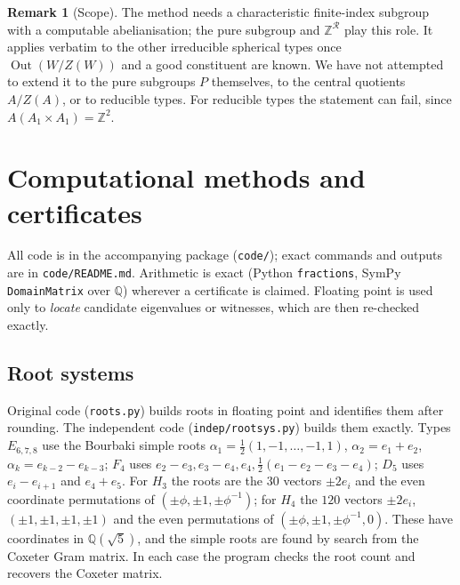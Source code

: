 \documentclass[11pt]{amsart}
\theoremstyle{definition}
\newtheorem{remark}[theorem]{Remark}
\newcommand{\Z}{\mathbb{Z}}
\newcommand{\Q}{\mathbb{Q}}
\newcommand{\R}{\mathcal{R}}
\newcommand{\Out}{\operatorname{Out}}
\begin{document}
\begin{remark}[Scope]
The method needs a characteristic finite-index subgroup with a computable abelianisation; the pure subgroup and
$\Z^\R$ play this role. It applies verbatim to the other irreducible spherical types once $\Out(W/Z(W))$ and a good
constituent are known. We have not attempted to extend it to the pure subgroups $P$ themselves, to the central
quotients $A/Z(A)$, or to reducible types. For reducible types the statement can fail, since $A(A_1\times A_1)=\Z^2$.
\end{remark}

\appendix
\section{Computational methods and certificates}\label{app:comp}

All code is in the accompanying package (\texttt{code/}); exact commands and outputs are in
\texttt{code/README.md}. Arithmetic is exact (Python \texttt{fractions}, SymPy \texttt{DomainMatrix} over $\Q$)
wherever a certificate is claimed. Floating point is used only to \emph{locate} candidate eigenvalues or
witnesses, which are then re-checked exactly.

\subsection{Root systems}\label{app:roots}
Original code (\texttt{roots.py}) builds roots in floating point and identifies them after rounding. The
independent code (\texttt{indep/rootsys.py}) builds them exactly. Types $E_{6,7,8}$ use the Bourbaki simple roots
$\alpha_1=\frac12(1,-1,\dots,-1,1)$, $\alpha_2=e_1+e_2$, $\alpha_k=e_{k-2}-e_{k-3}$; $F_4$ uses $e_2-e_3,e_3-e_4,e_4,
\frac12(e_1-e_2-e_3-e_4)$; $D_5$ uses $e_i-e_{i+1}$ and $e_4+e_5$. For $H_3$ the roots are the $30$ vectors
$\pm2e_i$ and the even coordinate permutations of $(\pm\phi,\pm1,\pm\phi^{-1})$; for $H_4$ the $120$ vectors
$\pm2e_i$, $(\pm1,\pm1,\pm1,\pm1)$ and the even permutations of $(\pm\phi,\pm1,\pm\phi^{-1},0)$. These have
coordinates in $\Q(\sqrt5)$, and the simple roots are found by search from the Coxeter Gram matrix. In each case the
program checks the root count and recovers the Coxeter matrix.
\end{document}
